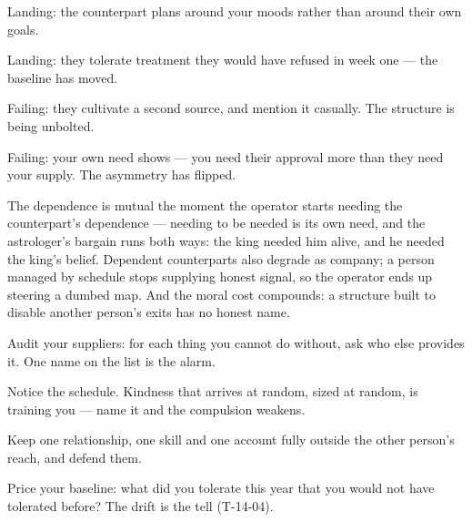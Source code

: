 \begin{feedback}
  \item Landing: the counterpart plans around your moods rather than around their own goals.
  \item Landing: they tolerate treatment they would have refused in week one --- the baseline has moved.
  \item Failing: they cultivate a second source, and mention it casually. The structure is being unbolted.
  \item Failing: your own need shows --- you need their approval more than they need your supply. The asymmetry has flipped.
\end{feedback}
\begin{failure}
The dependence is mutual the moment the operator starts needing the counterpart's dependence --- needing to be needed is its own need, and the astrologer's bargain runs both ways: the king needed him alive, and he needed the king's belief. Dependent counterparts also degrade as company; a person managed by schedule stops supplying honest signal, so the operator ends up steering a dumbed map. And the moral cost compounds: a structure built to disable another person's exits has no honest name.
\end{failure}
\begin{countermeasures}
  \item Audit your suppliers: for each thing you cannot do without, ask who else provides it. One name on the list is the alarm.
  \item Notice the schedule. Kindness that arrives at random, sized at random, is training you --- name it and the compulsion weakens.
  \item Keep one relationship, one skill and one account fully outside the other person's reach, and defend them.
  \item Price your baseline: what did you tolerate this year that you would not have tolerated before? The drift is the tell (T-14-04).
\end{countermeasures}

\seesources
{}
